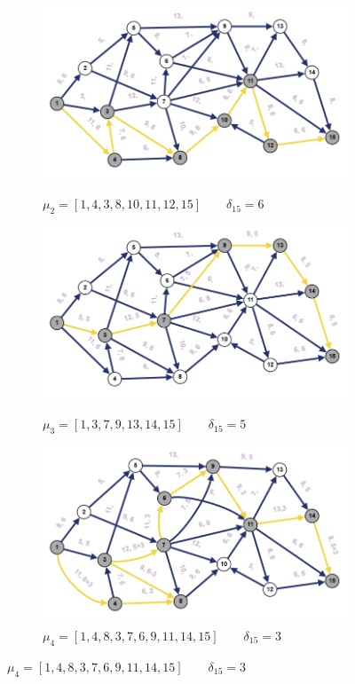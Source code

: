 \documentclass{article}
\begin{document}
\begin{enumerate}
\begin{figure}
\begin{subfigure}[b]{0.45\textwidth}
         \label{fig:18_1}
     \end{subfigure}
     \hfill
     \begin{subfigure}[b]{0.45\textwidth}
         \centering
         \caption*{\small{$\mu_2 = [1,4,3,8,10,11,12,15]\qquad \delta_{15}=6$}}
         \includegraphics[width=\textwidth]{attachments/18/18_2.png}
         \label{fig:18_2}
     \end{subfigure}
     \hfill
     \begin{subfigure}[b]{0.45\textwidth}
         \centering
         \caption*{\small{$\mu_3 = [1,3,7,9,13,14,15]\qquad\delta_{15}=5$}}
         \includegraphics[width=\textwidth]{attachments/18/18_3.png}
         \label{fig:18_3}
     \end{subfigure}
     \hfill
     \begin{subfigure}[b]{0.45\textwidth}
         \centering
         \caption*{\small{$\mu_4 = [1,4,8,3,7,6,9,11,14,15]\qquad \delta_{15}=3$}}
         \includegraphics[width=\textwidth]{attachments/18/18_4.png}

\end{subfigure}
\end{figure}
\end{enumerate}
\end{document}
